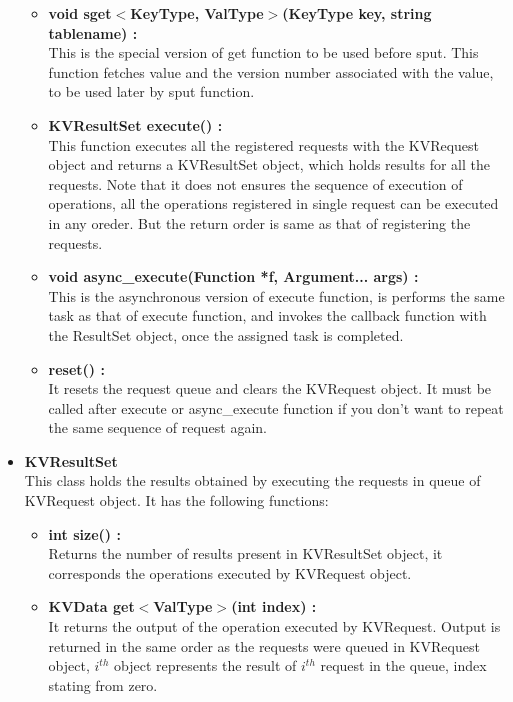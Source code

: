 \documentclass[11pt]{article}
\begin{document}
\begin{itemize}
\begin{itemize}
\item \textbf{void sget$<$KeyType, ValType$>$(KeyType key, string tablename) :}\\
This is the special version of get function to be used before sput. This function fetches value and the version number associated with the value, to be used later by sput function. \\

\item \textbf{KVResultSet execute() :}\\
This function executes all the registered requests with the KVRequest object and returns a KVResultSet object, which holds results for all the requests. Note that it does not ensures the sequence of execution of operations, all the operations registered in single request can be executed in any oreder. But the return order is same as that of registering the requests.\\

\item \textbf{void async\_execute(Function *f, Argument... args) :}\\
This is the asynchronous version of execute function, is performs the same task as that of execute function, and invokes the callback function with the ResultSet object, once the assigned task is completed.\\

\item \textbf{reset() :}\\
It resets the request queue and clears the KVRequest object. It must be called after execute or async\_execute function if you don't want to repeat the same sequence of request again.\\
\end{itemize}

\item \textbf{KVResultSet} \\
This class holds the results obtained by executing the requests in queue of KVRequest object. It has the following functions:
\begin{itemize}
\item \textbf{int size() :}\\
Returns the number of results present in KVResultSet object, it corresponds the operations executed by KVRequest object.\\

\item \textbf{KVData get$<$ValType$>$(int index) :}\\
It returns the output of the operation executed by KVRequest. Output is returned in the same order as the requests were queued in KVRequest object, $i^{th}$ object represents the result of $i^{th}$ request in the queue, index stating from zero.\\


\end{itemize}
\end{itemize}
\end{document}
